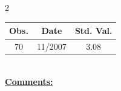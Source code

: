 
\bigskip 
\begin{multicols}{2}{ 
\begin{tabular}{ccc}
\hline  Obs.  &  Date &  Std. Val. \\ 
\hline 
                       70 &       11/2007 &          3.08 \vspace{-.12in} \\  
 \end{tabular} 
\\ 
 \columnbreak 
 \singlespacing 
 \underline{\textbf{Comments:}} \\ 
 \bigskip       

 } 
\end{multicols} 
